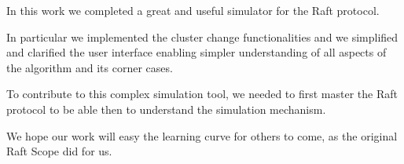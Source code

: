 In this work we completed a great and useful simulator for the Raft protocol.

In particular we implemented the cluster change functionalities and
we simplified and clarified the user interface enabling simpler understanding
of all aspects of the algorithm and its corner cases.

To contribute to this complex simulation tool, we needed to first master the
Raft protocol to be able then to understand the simulation mechanism.

We hope our work will easy the learning curve for others to come,
as the original Raft Scope did for us.
